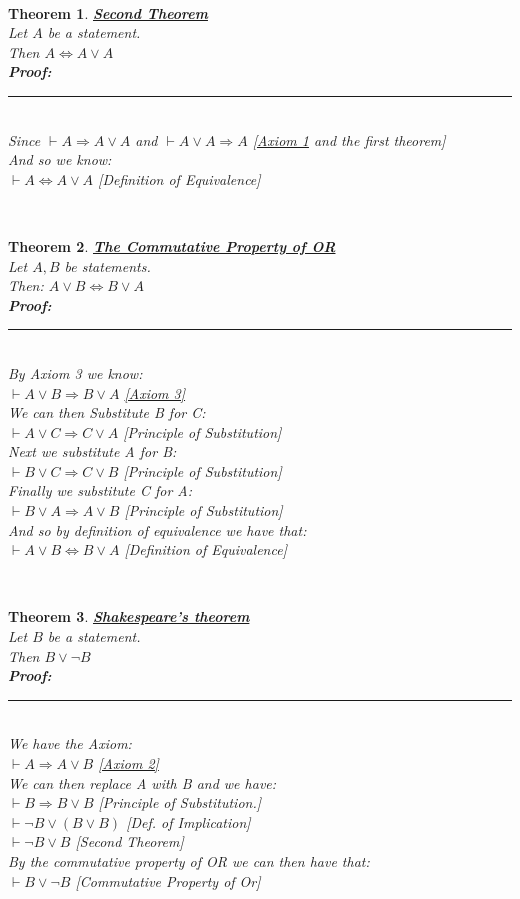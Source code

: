 \documentclass[12pt]{extarticle}
\theoremstyle{plain}
\newtheorem{thm}{Theorem}[section]
\theoremstyle{plain}
\theoremstyle{plain}
\theoremstyle{Definition}
\theoremstyle{Definition}
\theoremstyle{plain}
\theoremstyle{plain}
\newcommand{\cut}[0]{\noindent\framebox[\linewidth]{\rule{\linewidth}{2pt}}\\}
\newcommand{\prof}[0]{	\noindent \textbf{Proof:} \rule{500pt}{2pt} \\ }
\begin{document}
\cut
\begin{thm} \underline{\textbf{Second Theorem}} \\
	Let $A$ be a statement. \\ 
	Then $A \Leftrightarrow A \lor A $ \\ 	
	\prof
	Since $\vdash A \Rightarrow A \lor A$ and $\vdash A \lor A \Rightarrow A$ \hfill [\hyperlink{Axioms}{Axiom 1} and the first theorem]\\
	And so we know: \\
	$\vdash A \Leftrightarrow A \lor A$ \hfill [Definition of Equivalence]
\end{thm}
\cut
\begin{thm} \underline{\textbf{The Commutative Property of OR}} \\
	Let $A,B$ be statements. \\
	Then: $A \lor B \Leftrightarrow B \lor A$ \\ 
	\prof
	By Axiom 3 we know: \\ 
	$\vdash A \lor B \Rightarrow B \lor A$ \hfill \hyperlink{Axioms}{[Axiom 3]} \\
	We can then Substitute B for C: \\
	$\vdash A \lor C \Rightarrow C \lor A$ \hfill [Principle of Substitution] \\
	Next we substitute A for B: \\ 
	$\vdash B \lor C \Rightarrow C \lor B$ \hfill [Principle of Substitution] \\
	Finally we substitute C for A: \\ 
	$\vdash B \lor A \Rightarrow A \lor B$ \hfill [Principle of Substitution] \\
	And so by definition of equivalence we have that: \\
	$\vdash A \lor B \Leftrightarrow B \lor A$ \hfill [Definition of Equivalence]
\end{thm}
\cut
\begin{thm} \underline{\textbf{Shakespeare's theorem}} \\ 
	Let $B$ be a statement. \\
	Then $B \lor \lnot B$ \\ 
	\prof
	We have the Axiom: \\
	$\vdash A \Rightarrow A \lor B$ \hfill \hyperlink{Axioms}{[Axiom 2]} \\ 
	We can then replace A with B and  we have: \\ 
	$\vdash B \Rightarrow B \lor B$ \hfill [Principle of Substitution.] \\ 
	$\vdash \lnot B \lor (B \lor B)$ \hfill [Def. of Implication]\\ 
	$\vdash \lnot B \lor B$ \hfill [Second Theorem] \\ 
	By the commutative property of OR we can then have that: \\ 
	$\vdash B \lor \lnot B$ \hfill [Commutative Property of Or] 
\end{thm}
\end{document}
